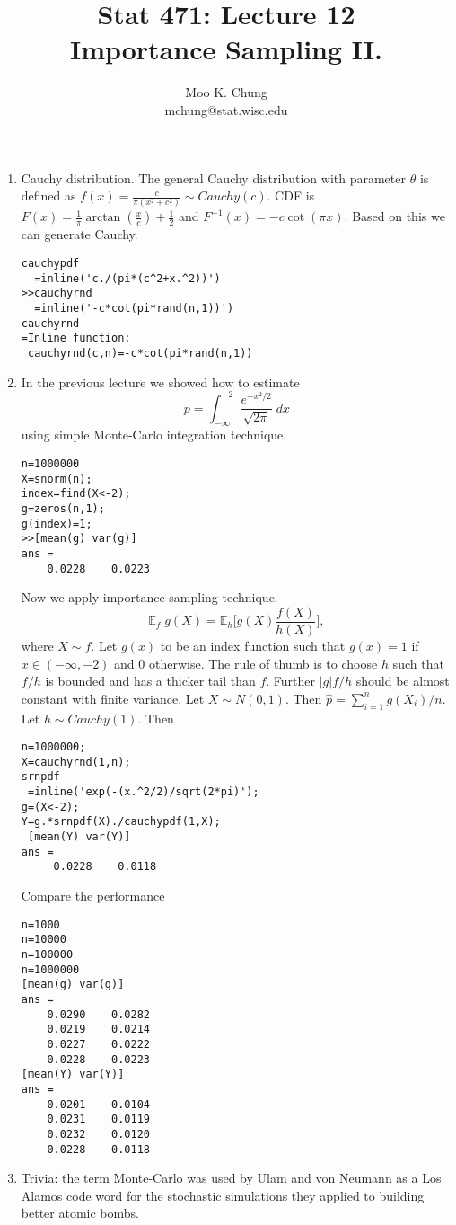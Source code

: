 \documentclass[11pt,twocolumn]{article} %
\begin{document}
\title{Stat 471: Lecture 12\\
Importance Sampling II.}
\author{Moo K. Chung\\
mchung@stat.wisc.edu}
\maketitle \thispagestyle{empty}

\begin{enumerate}

\item Cauchy distribution. The general Cauchy distribution with
parameter $\theta$ is defined as $f(x)=\frac{c}{\pi(x^2 + c^2)}
\sim Cauchy(c)$. CDF is $F(x) = \frac{1}{\pi}\arctan(\frac{x}{c})
+ \frac{1}{2}$ and $F^{-1}(x) = -c\cot(\pi x)$. Based on this we
can generate Cauchy.

\begin{verbatim}
cauchypdf
  =inline('c./(pi*(c^2+x.^2))')
>>cauchyrnd
  =inline('-c*cot(pi*rand(n,1))')
cauchyrnd 
=Inline function:
 cauchyrnd(c,n)=-c*cot(pi*rand(n,1))
\end{verbatim}


 \item In the previous
lecture we showed how to estimate
$$p=\int_{-\infty}^{-2} \frac{e^{-x^2/2}}{\sqrt{2\pi}} \; dx$$
using simple Monte-Carlo integration technique.
\begin{verbatim}
n=1000000
X=snorm(n);
index=find(X<-2);
g=zeros(n,1);
g(index)=1;
>>[mean(g) var(g)]
ans =
    0.0228    0.0223
\end{verbatim}

Now we apply importance sampling technique.
$$\mathbb{E}_f \;g(X)= \mathbb{E}_h \Big[g(X)\frac{f(X)}{h(X)}\Big],$$
where $X \sim f$. Let $g(x)$ to be an index function such that $g(x)= 1$ if $x \in
(-\infty,-2)$ and 0 otherwise. The rule of thumb is to choose $h$
such that $f/h$ is bounded and has a thicker tail than $f$.
Further $|g|f/h$ should be almost constant with finite variance. 
 Let $X \sim N(0,1)$. Then $\hat p =
\sum_{i=1}^ng(X_i)/n$. Let $h \sim Cauchy(1)$. Then

\begin{verbatim}
n=1000000; 
X=cauchyrnd(1,n);
srnpdf
 =inline('exp(-(x.^2/2)/sqrt(2*pi)');
g=(X<-2);
Y=g.*srnpdf(X)./cauchypdf(1,X);
 [mean(Y) var(Y)]
ans =
     0.0228    0.0118
\end{verbatim}
Compare the performance 
\begin{verbatim}
n=1000
n=10000
n=100000
n=1000000
[mean(g) var(g)]
ans =
    0.0290    0.0282
    0.0219    0.0214
    0.0227    0.0222
    0.0228    0.0223
[mean(Y) var(Y)]
ans =
    0.0201    0.0104
    0.0231    0.0119
    0.0232    0.0120
    0.0228    0.0118
\end{verbatim}
\item Trivia: the term Monte-Carlo was used by Ulam and von
Neumann as a Los Alamos code word for the stochastic simulations
they applied to building better atomic bombs.
\end{enumerate}
\end{document}
